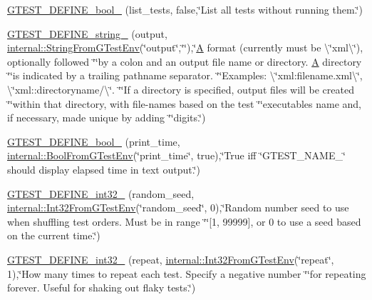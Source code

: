 \begin{DoxyCompactItemize}
\hyperlink{namespacetesting_a9ef54a5b29ac4b2a1e086e77224a0b19}{G\+T\+E\+S\+T\+\_\+\+D\+E\+F\+I\+N\+E\+\_\+bool\+\_\+} (list\+\_\+tests, false,\char`\"{}List all tests without running them.\char`\"{})
\item 
\hyperlink{namespacetesting_a9f8de43b364103bafa1e8ca4bebe9d58}{G\+T\+E\+S\+T\+\_\+\+D\+E\+F\+I\+N\+E\+\_\+string\+\_\+} (output, \hyperlink{namespacetesting_1_1internal_ac54dabc540bf79c2de91add679bfb93b}{internal\+::\+String\+From\+G\+Test\+Env}(\char`\"{}output\char`\"{},\char`\"{}\char`\"{}),\char`\"{}\hyperlink{namespacetesting_a5e9134d655d2fc9323902348083282e7}{A} format (currently must be \textbackslash{}\char`\"{}xml\textbackslash{}\char`\"{}), optionally followed \char`\"{}\char`\"{}by a colon and an output file name or directory. \hyperlink{namespacetesting_a5e9134d655d2fc9323902348083282e7}{A} directory \char`\"{}\char`\"{}is indicated by a trailing pathname separator. \char`\"{}\char`\"{}Examples\+: \textbackslash{}\char`\"{}xml\+:filename.\+xml\textbackslash{}\char`\"{}, \textbackslash{}\char`\"{}xml\+::directoryname/\textbackslash{}\char`\"{}. \char`\"{}\char`\"{}If a directory is specified, output files will be created \char`\"{}\char`\"{}within that directory, with file-\/names based on the test \char`\"{}\char`\"{}executable\textquotesingle{}s name and, if necessary, made unique by adding \char`\"{}\char`\"{}digits.\char`\"{})
\item 
\hyperlink{namespacetesting_a51fb68302e8e3fce5bd61340843a6e6a}{G\+T\+E\+S\+T\+\_\+\+D\+E\+F\+I\+N\+E\+\_\+bool\+\_\+} (print\+\_\+time, \hyperlink{namespacetesting_1_1internal_a67132cdce23fb71b6c38ee34ef81eb4c}{internal\+::\+Bool\+From\+G\+Test\+Env}(\char`\"{}print\+\_\+time\char`\"{}, true),\char`\"{}True iff \char`\"{}G\+T\+E\+S\+T\+\_\+\+N\+A\+M\+E\+\_\+\char`\"{} should display elapsed time in text output.\char`\"{})
\item 
\hyperlink{namespacetesting_a25e098abb7ce93d06582d48434be90c7}{G\+T\+E\+S\+T\+\_\+\+D\+E\+F\+I\+N\+E\+\_\+int32\+\_\+} (random\+\_\+seed, \hyperlink{namespacetesting_1_1internal_a0f7e728793f9e6cb0aa2b69eaa468bf3}{internal\+::\+Int32\+From\+G\+Test\+Env}(\char`\"{}random\+\_\+seed\char`\"{}, 0),\char`\"{}Random number seed to use when shuffling test orders.  Must be in range \char`\"{}\char`\"{}\mbox{[}1, 99999\mbox{]}, or 0 to use a seed based on the current time.\char`\"{})
\item 
\hyperlink{namespacetesting_a8b2c1dad0764e0984486bae49a988f0e}{G\+T\+E\+S\+T\+\_\+\+D\+E\+F\+I\+N\+E\+\_\+int32\+\_\+} (repeat, \hyperlink{namespacetesting_1_1internal_a0f7e728793f9e6cb0aa2b69eaa468bf3}{internal\+::\+Int32\+From\+G\+Test\+Env}(\char`\"{}repeat\char`\"{}, 1),\char`\"{}How many times to repeat each test.  Specify a negative number \char`\"{}\char`\"{}for repeating forever.  Useful for shaking out flaky tests.\char`\"{})

\end{DoxyCompactItemize}
